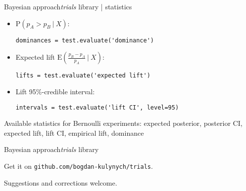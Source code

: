 \documentclass[pdf]{beamer}
\begin{document}
\begin{frame}[fragile]{Bayesian approach}{\emph{trials} library | statistics}

\begin{itemize}
	\item $\text{P}(p_A > p_B ~|~ X)$:
\begin{lstlisting}
dominances = test.evaluate('dominance')
\end{lstlisting}

	\item Expected lift $\text{E}(\frac{p_B - p_A}{p_A} ~|~ X)$:
\begin{lstlisting}
lifts = test.evaluate('expected lift')
\end{lstlisting}

	\item Lift 95\%-credible interval:
\begin{lstlisting}
intervals = test.evaluate('lift CI', level=95)
\end{lstlisting}
\end{itemize}

Available statistics for Bernoulli experiments: expected posterior, posterior CI, expected lift, lift CI, empirical lift, dominance

\end{frame}


\begin{frame}{Bayesian approach}{\emph{trials} library}

Get it on \texttt{github.com/bogdan-kulynych/trials}.

Suggestions and corrections welcome.

\end{frame}
\end{document}
